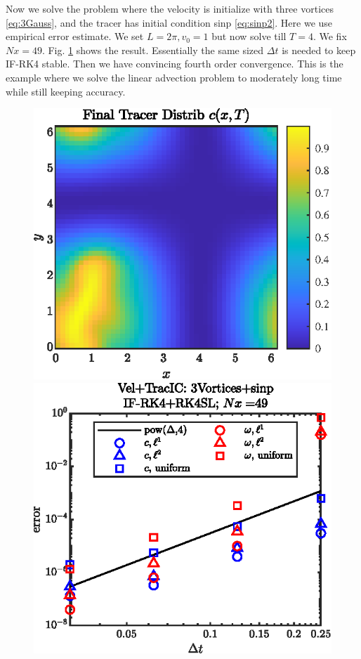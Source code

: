 \documentclass[11pt,letterpaper]{article}
\begin{document}
Now we solve the problem where the velocity is initialize with three vortices \eqref{eq:3Gauss}, and the tracer has initial condition sinp \eqref{eq:sinp2}. Here we use empirical error estimate. We set $L = 2\pi, v_0 = 1$ but now solve till $T = 4$. We fix $Nx = 49$. Fig. \ref{fig:NSAdv_c_final_3Vortices_sinp} shows the result. Essentially the same sized $\Delta t$ is needed to keep IF-RK4 stable. Then we have convincing fourth order convergence. This is the example where we solve the linear advection problem to moderately long time while still keeping accuracy.
\begin{figure}[H]
    \centering
    \includegraphics{figs/NSAdv_c_final_3Vortices_sinp}
    \includegraphics{figs/NSAdv_conv_order_3Vortices_sinp}
    \caption{}\label{fig:NSAdv_c_final_3Vortices_sinp}
\end{figure}

\newpage


\end{document}
